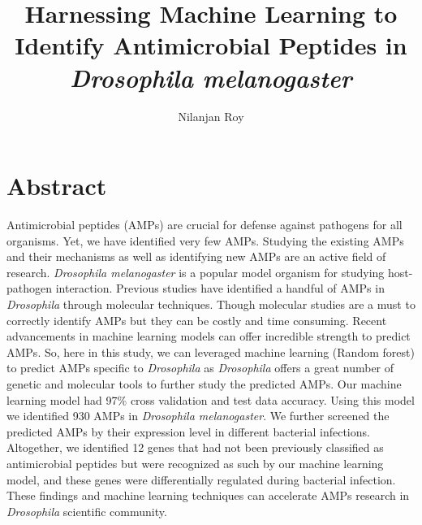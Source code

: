 \documentclass[letterpaper,11pt]{article}
\title{Harnessing Machine Learning to Identify Antimicrobial Peptides in \textit{Drosophila melanogaster}}
\author[a,*]{Nilanjan Roy}
\date{}
\affil[a]{Department of Molecular Biosciences, University of Kansas}
\affil[*]{Corresponding author: nilanjan.roy@ku.edu}
\begin{document}
\maketitle

\section{Abstract}
Antimicrobial peptides (AMPs) are crucial for defense against pathogens for all organisms. Yet, we have identified very few AMPs. Studying the existing AMPs and their mechanisms as well as identifying new AMPs are an active field of research. \textit{Drosophila melanogaster} is a popular model organism for studying host-pathogen interaction. Previous studies have identified a handful of AMPs in \textit{Drosophila} through molecular techniques. Though molecular studies are a must to correctly identify AMPs but they can be costly and time consuming. Recent advancements in machine learning models can offer incredible strength to predict AMPs. So, here in this study, we can leveraged machine learning (Random forest) to predict AMPs specific to \textit{Drosophila} as \textit{Drosophila} offers a great number of genetic and molecular tools to further study the predicted AMPs.  Our machine learning model had 97\% cross validation and test data accuracy. Using this model we identified 930 AMPs in \textit{Drosophila melanogaster}. We further screened the predicted AMPs by their expression level in different bacterial infections. Altogether, we identified 12 genes that had not been previously classified as antimicrobial peptides but were recognized as such by our machine learning model, and these genes were differentially regulated during bacterial infection. These findings and machine learning techniques can accelerate AMPs research in \textit{Drosophila} scientific community. 
\end{document}
